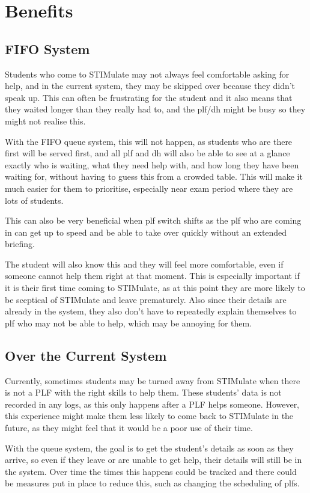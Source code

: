 \documentclass{article}
\begin{document}
\section{Benefits}
{
	\subsection{FIFO System}
	{
		Students who come to STIMulate may not always feel comfortable asking for help, and in the current system, they may be skipped over because they didn't speak up. This can often be frustrating for the student and it also means that they waited longer than they really had to, and the \ac{plf}/\ac{dh} might be busy so they might not realise this. 
	
		With the FIFO queue system, this will not happen, as students who are there first will be served first, and all \ac{plf} and \ac{dh} will also be able to see at a glance exactly who is waiting, what they need help with, and how long they have been waiting for, without having to guess this from a crowded table. This will make it much easier for them to prioritise, especially near exam period where they are lots of students. 
	
		This can also be very beneficial when \ac{plf} switch shifts as the \ac{plf} who are coming in can get up to speed and be able to take over quickly without an extended briefing. 
	
		The student will also know this and they will feel more comfortable, even if someone cannot help them right at that moment. This is especially important if it is their first time coming to STIMulate, as at this point they are more likely to be sceptical of STIMulate and leave prematurely. Also since their details are already in the system, they also don’t have to repeatedly explain themselves to \ac{plf} who may not be able to help, which may be annoying for them.
	}
	
	\subsection{Over the Current System}
	{
		Currently, sometimes students may be turned away from STIMulate when there is not a PLF with the right skills to help them. These students' data is not recorded in any logs, as this only happens after a PLF helps someone.  However, this experience might make them less likely to come back to STIMulate in the future, as they might feel that it would be a poor use of their time. 
			
		With the queue system, the goal is to get the student's details as soon as they arrive, so even if they leave or are unable to get help, their details will still be in the system. Over time the times this happens could be tracked and there could be measures put in place to reduce this, such as changing the scheduling of \ac{plf}s.
		
}}
\end{document}

